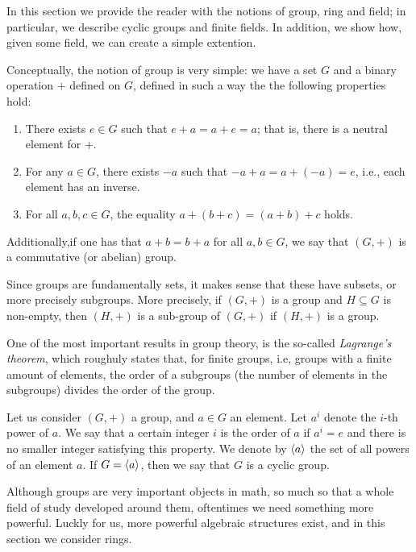\documentclass{subfiles}
\begin{document}
    In this section we provide the reader with the notions of group, ring and field;
        in particular, we describe cyclic groups and finite fields.
        In addition, we show how, given some field, we can create a simple extention.

    Conceptually, the notion of group is very simple:
        we have a set $G$ and a binary operation $+$ defined on $G$,
        defined in such a way the the following properties hold:
        \begin{enumerate}
            \item There exists $e \in G$ such that $e + a = a + e = a$;
                that is, there is a neutral element for $+$.

            \item For any $a \in G$, there exists $-a$ such that $-a + a = a + (-a) = e$,
                i.e., each element has an inverse.

            \item For all $a, b, c \in G$, the equality $a + (b + c) = (a + b) + c$ holds.
        \end{enumerate}
        Additionally,if one has that $a + b = b + a$ for all $a, b \in G$,
        we say that $(G, +)$ is a commutative (or abelian) group.

    Since groups are fundamentally sets, it makes sense that these have subsets,
        or more precisely subgroups. More precisely, if $(G, +)$ is a group and 
        $H \subseteq G$ is non-empty, then $(H, +)$ is a sub-group of $(G, +)$ if $(H, +)$ is a group.
        
    One of the most important results in group theory,
        is the so-called \emph{Lagrange's theorem},
        which roughuly states that, for finite groups, i.e, groups with a finite amount of elements,
        the order of a subgroups (the number of elements in the subgroups) divides the order of the group.

    Let us consider $(G, +)$ a group, and $a \in G$ an element.
        Let $a^{i}$ denote the $i$-th power of $a$.
        We say that a certain integer $i$ is the order of $a$ if $a^{i} = e$ and there is no smaller integer satisfying this property. 
        We denote by $\langle a \rangle$ the set of all powers of an element $a$.
        If $G = \langle a \rangle$, then we say that $G$ is a cyclic group.
    
    Although groups are very important objects in math,
        so much so that a whole field of study developed around them,
        oftentimes we need something more powerful.
        Luckly for us, more powerful algebraic structures exist,
        and in this section we consider rings.
\end{document}
